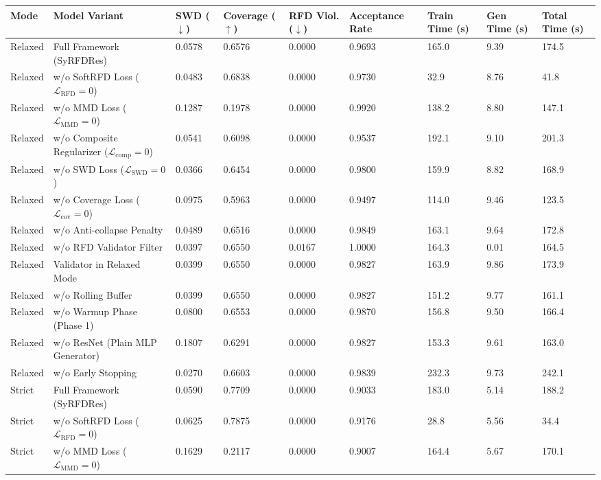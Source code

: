 \begin{tabular}{lllllllll}
\toprule
Mode & Model Variant & SWD ($\downarrow$) & Coverage ($\uparrow$) & RFD Viol. ($\downarrow$) & Acceptance Rate & Train Time (s) & Gen Time (s) & Total Time (s) \\
\midrule
Relaxed & Full Framework (SyRFDRes) & 0.0578 & 0.6576 & 0.0000 & 0.9693 & 165.0 & 9.39 & 174.5 \\
Relaxed & w/o SoftRFD Loss ($\mathcal{L}_{\mathrm{RFD}}=0$) & 0.0483 & 0.6838 & 0.0000 & 0.9730 & 32.9 & 8.76 & 41.8 \\
Relaxed & w/o MMD Loss ($\mathcal{L}_{\mathrm{MMD}}=0$) & 0.1287 & 0.1978 & 0.0000 & 0.9920 & 138.2 & 8.80 & 147.1 \\
Relaxed & w/o Composite Regularizer ($\mathcal{L}_{\mathrm{comp}}=0$) & 0.0541 & 0.6098 & 0.0000 & 0.9537 & 192.1 & 9.10 & 201.3 \\
Relaxed & w/o SWD Loss ($\mathcal{L}_{\mathrm{SWD}}=0$) & 0.0366 & 0.6454 & 0.0000 & 0.9800 & 159.9 & 8.82 & 168.9 \\
Relaxed & w/o Coverage Loss ($\mathcal{L}_{\mathrm{cov}}=0$) & 0.0975 & 0.5963 & 0.0000 & 0.9497 & 114.0 & 9.46 & 123.5 \\
Relaxed & w/o Anti-collapse Penalty & 0.0489 & 0.6516 & 0.0000 & 0.9849 & 163.1 & 9.64 & 172.8 \\
Relaxed & w/o RFD Validator Filter & 0.0397 & 0.6550 & 0.0167 & 1.0000 & 164.3 & 0.01 & 164.5 \\
Relaxed & Validator in Relaxed Mode & 0.0399 & 0.6550 & 0.0000 & 0.9827 & 163.9 & 9.86 & 173.9 \\
Relaxed & w/o Rolling Buffer & 0.0399 & 0.6550 & 0.0000 & 0.9827 & 151.2 & 9.77 & 161.1 \\
Relaxed & w/o Warmup Phase (Phase 1) & 0.0800 & 0.6553 & 0.0000 & 0.9870 & 156.8 & 9.50 & 166.4 \\
Relaxed & w/o ResNet (Plain MLP Generator) & 0.1807 & 0.6291 & 0.0000 & 0.9827 & 153.3 & 9.61 & 163.0 \\
Relaxed & w/o Early Stopping & 0.0270 & 0.6603 & 0.0000 & 0.9839 & 232.3 & 9.73 & 242.1 \\
Strict & Full Framework (SyRFDRes) & 0.0590 & 0.7709 & 0.0000 & 0.9033 & 183.0 & 5.14 & 188.2 \\
Strict & w/o SoftRFD Loss ($\mathcal{L}_{\mathrm{RFD}}=0$) & 0.0625 & 0.7875 & 0.0000 & 0.9176 & 28.8 & 5.56 & 34.4 \\
Strict & w/o MMD Loss ($\mathcal{L}_{\mathrm{MMD}}=0$) & 0.1629 & 0.2117 & 0.0000 & 0.9007 & 164.4 & 5.67 & 170.1 \\

\end{tabular}
